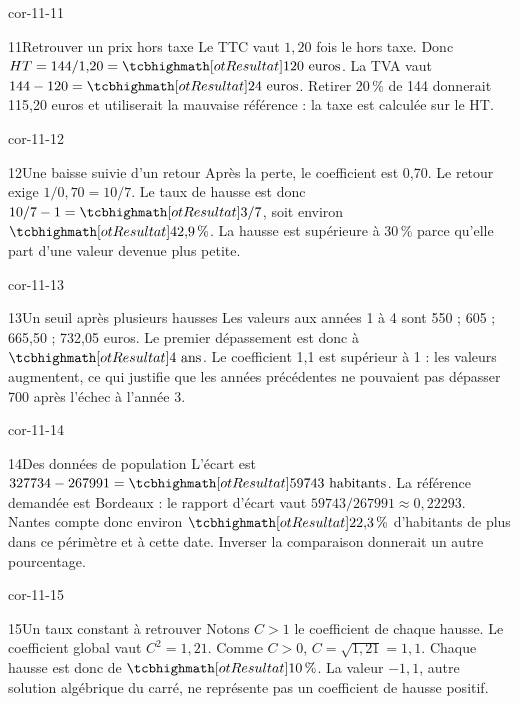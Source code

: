 \begin{blocLivre}{cor-11-11}
\begin{corrige}{11}{Retrouver un prix hors taxe}
Le TTC vaut $1{,}20$ fois le hors taxe. Donc $HT=144/1{,}20=\res{120\text{ euros}}$. La TVA vaut $144-120=\res{24\text{ euros}}$. Retirer 20\,\% de 144 donnerait 115,20 euros et utiliserait la mauvaise référence : la taxe est calculée sur le HT.
\end{corrige}
\end{blocLivre}
\begin{blocLivre}{cor-11-12}
\begin{corrige}{12}{Une baisse suivie d’un retour}
Après la perte, le coefficient est 0,70. Le retour exige $1/0{,}70=10/7$. Le taux de hausse est donc $10/7-1=\res{3/7}$, soit environ $\res{42{,}9\,\%}$. La hausse est supérieure à 30\,\% parce qu’elle part d’une valeur devenue plus petite.
\end{corrige}
\end{blocLivre}
\begin{blocLivre}{cor-11-13}
\begin{corrige}{13}{Un seuil après plusieurs hausses}
Les valeurs aux années 1 à 4 sont 550 ; 605 ; 665,50 ; 732,05 euros. Le premier dépassement est donc à $\res{4\text{ ans}}$. Le coefficient 1,1 est supérieur à 1 : les valeurs augmentent, ce qui justifie que les années précédentes ne pouvaient pas dépasser 700 après l’échec à l’année 3.
\end{corrige}
\end{blocLivre}
\begin{blocLivre}{cor-11-14}
\begin{corrige}{14}{Des données de population}
L’écart est $327734-267991=\res{59743\text{ habitants}}$. La référence demandée est Bordeaux : le rapport d’écart vaut $59743/267991\approx0{,}22293$. Nantes compte donc environ $\res{22{,}3\,\%}$ d’habitants de plus dans ce périmètre et à cette date. Inverser la comparaison donnerait un autre pourcentage.
\end{corrige}
\end{blocLivre}
\begin{blocLivre}{cor-11-15}
\begin{corrige}{15}{Un taux constant à retrouver}
Notons $C>1$ le coefficient de chaque hausse. Le coefficient global vaut $C^2=1{,}21$. Comme $C>0$, $C=\sqrt{1{,}21}=1{,}1$. Chaque hausse est donc de $\res{10\,\%}$. La valeur $-1{,}1$, autre solution algébrique du carré, ne représente pas un coefficient de hausse positif.
\end{corrige}
\end{blocLivre}
